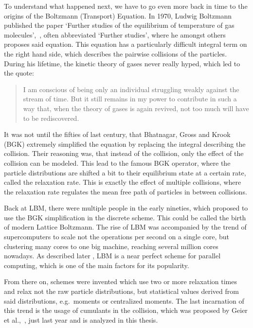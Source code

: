 To understand what happened next, we have to go even more back in time to the origins of the Boltzmann (Transport) Equation. In 1970, Ludwig Boltzmann published the paper `Further studies of the equilibrium of temperature of gas molecules',~\cite{Boltzmann1970}, often abbreviated `Further studies', where he amongst others proposes said equation. This equation has a particularly difficult integral term on the right hand side, which describes the pairwise collisions of the particles. During his lifetime, the kinetic theory of gases never really hyped, which led to the quote:
\begin{quotation}
I am conscious of being only an individual struggling weakly against the stream of time. But it still remains in my power to contribute in such a way that, when the theory of gases is again revived, not too much will have to be rediscovered.
\end{quotation}
It was not until the fifties of last century, that Bhatnagar, Gross and Krook (BGK) extremely simplified the equation by replacing the integral describing the collision. Their reasoning was, that instead of the collision, only the effect of the collision can be modeled. This lead to the famous BGK operator, where the particle distributions are shifted a bit to their equilibrium state at a certain rate, called the relaxation rate. This is exactly the effect of multiple collisions, where the relaxation rate regulates the mean free path of particles in between collisions.

Back at LBM, there were multiple people in the early nineties, which proposed to use the BGK simplification in the discrete scheme. This could be called the birth of modern Lattice Boltzmann. The rise of LBM was accompanied by the trend of supercomputers to scale not the operations per second on a single core, but clustering many cores to one big machine, reaching several million cores nowadays. As described later , LBM is a near perfect scheme for parallel computing, which is one of the main factors for its popularity.

From there on, schemes were invented which use two or more relaxation times and relax not the raw particle distributions, but statistical values derived from said distributions, e.g.\ moments or centralized moments. The last incarnation of this trend is the usage of cumulants in the collision, which was proposed by Geier et al.,~\cite{geier2015cumulant}, just last year and is analyzed in this thesis.

